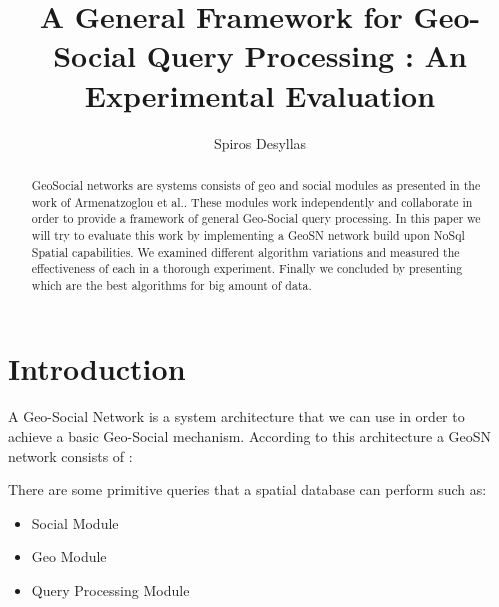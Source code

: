 \documentclass[prodmode,acmtods]{acmsmall} %
\begin{document}

\title{A General Framework for Geo-Social Query Processing
: An Experimental
Evaluation
}
\author{Spiros Desyllas
}

\begin{abstract}
GeoSocial networks are systems consists of geo and social modules as presented in the work of Armenatzoglou et al.\cite{Armenatzoglou:geosn}. These modules work independently and collaborate in order to provide a framework of general Geo-Social query processing. In this paper we will try to evaluate this work by implementing a GeoSN network build upon NoSql Spatial capabilities. We examined different algorithm variations and measured the effectiveness of each in a thorough experiment. Finally we concluded by presenting which are the best algorithms for big amount of data.
\end{abstract}                                                                                     
          
\maketitle
\section{Introduction}
A Geo-Social Network \cite{Armenatzoglou:geosn} is a system architecture that we can use in order to achieve a basic Geo-Social mechanism. According to this architecture a GeoSN network consists of : 

There are some primitive queries that a spatial database can perform such as:
\begin{itemize}
  \item Social Module
  \item Geo Module
  \item Query Processing Module
\end{itemize}
\end{document}
